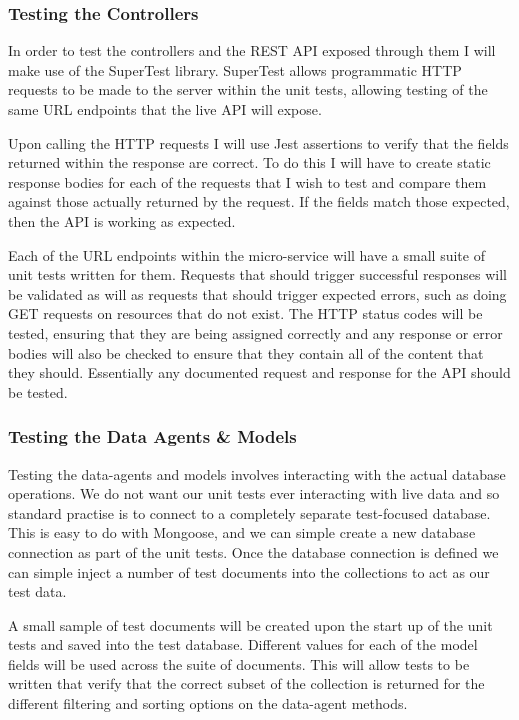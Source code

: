 \subsubsection{Testing the Controllers}
In order to test the controllers and the REST API exposed through them I will make use of the SuperTest library. SuperTest allows programmatic HTTP requests to be made to the server within the unit tests, allowing testing of the same URL endpoints that the live API will expose.

Upon calling the HTTP requests I will use Jest assertions to verify that the fields returned within the response are correct. To do this I will have to create static response bodies for each of the requests that I wish to test and compare them against those actually returned by the request. If the fields match those expected, then the API is working as expected.

Each of the URL endpoints within the micro-service will have a small suite of unit tests written for them. Requests that should trigger successful responses will be validated as will as requests that should trigger expected errors, such as doing GET requests on resources that do not exist. The HTTP status codes will be tested, ensuring that they are being assigned correctly and any response or error bodies will also be checked to ensure that they contain all of the content that they should. Essentially any documented request and response for the API should be tested.
\subsubsection{Testing the Data Agents \& Models}
Testing the data-agents and models involves interacting with the actual database operations. We do not want our unit tests ever interacting with live data and so standard practise is to connect to a completely separate test-focused database. This is easy to do with Mongoose, and we can simple create a new database connection as part of the unit tests. Once the database connection is defined we can simple inject a number of test documents into the collections to act as our test data.

A small sample of test documents will be created upon the start up of the unit tests and saved into the test database. Different values for each of the model fields will be used across the suite of documents. This will allow tests to be written that verify that the correct subset of the collection is returned for the different filtering and sorting options on the data-agent methods.

